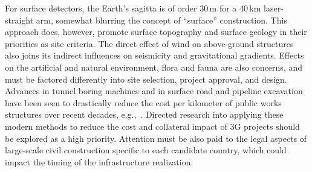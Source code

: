 For surface detectors, 
the Earth’s sagitta is of order 30\,m for a 40\,km laser-straight arm, somewhat blurring the concept of “surface” construction. This approach does, however, promote surface topography and surface geology in their priorities as site criteria. The direct effect of wind on above-ground structures also joins its indirect influences on seismicity and gravitational gradients. Effects on the artificial and natural environment, flora and fauna are also concerns, and must be factored differently into site selection, project approval, and design.
Advances in tunnel boring machines and in surface road and pipeline excavation have been seen to drastically reduce the cost per kilometer of public works structures over recent decades, e.g.,~\cite{BoringCompany}. Directed research into applying these modern methods to reduce the cost and collateral impact of 3G projects should be explored as a high priority. Attention must be also paid to the legal aspects of large-scale civil construction specific to each candidate country, which could impact the timing of the infrastructure realization. 




